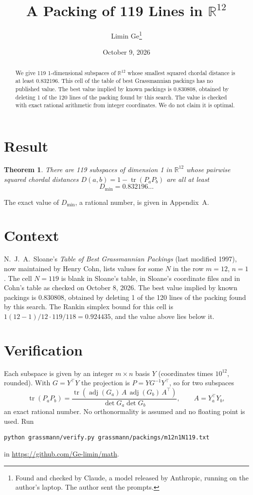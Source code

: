 \documentclass[11pt,a4paper]{article}
\title{A Packing of 119 Lines in $\mathbb{R}^{12}$}
\author{Limin Ge\thanks{Found and checked by Claude, a model released by Anthropic, running on the author's laptop. The author sent the prompts.}}
\date{October 9, 2026}
\newtheorem*{theorem}{Theorem}
\begin{document}
\maketitle
\begin{abstract}
We give 119 1-dimensional subspaces of $\mathbb{R}^{12}$ whose smallest squared chordal distance is at least 0.832196. This cell of the table of best Grassmannian packings has no published value. The best value implied by known packings is 0.830808, obtained by deleting 1 of the 120 lines of the packing found by this search. The value is checked with exact rational arithmetic from integer coordinates. We do not claim it is optimal.
\end{abstract}

\section{Result}
\begin{theorem}
There are 119 subspaces of dimension 1 in $\mathbb{R}^{12}$ whose pairwise squared chordal distances $D(a,b) = 1 - \operatorname{tr}(P_aP_b)$ are all at least
\[ D_{\min} = 0.832196\ldots \]
\end{theorem}
The exact value of $D_{\min}$, a rational number, is given in Appendix~A.


\section{Context}
N.~J.~A.~Sloane's \emph{Table of Best Grassmannian Packings} (last modified 1997), now maintained by Henry Cohn, lists values for some $N$ in the row $m=12$, $n=1$. The cell $N=119$ is blank in Sloane's table, in Sloane's coordinate files and in Cohn's table as checked on October 8, 2026. The best value implied by known packings is 0.830808, obtained by deleting 1 of the 120 lines of the packing found by this search. The Rankin simplex bound for this cell is $1(12-1)/12\cdot 119/118 = 0.924435$, and the value above lies below it.


\section{Verification}
Each subspace is given by an integer $m\times n$ basis $Y$ (coordinates times $10^{12}$, rounded). With $G=Y^\top Y$ the projection is $P=YG^{-1}Y^\top$, so for two subspaces
\[ \operatorname{tr}(P_aP_b)=\frac{\operatorname{tr}(\operatorname{adj}(G_a)\,A\,\operatorname{adj}(G_b)\,A^\top)}{\det G_a\det G_b},\qquad A=Y_a^\top Y_b, \]
an exact rational number. No orthonormality is assumed and no floating point is used. Run
\begin{verbatim}
python grassmann/verify.py grassmann/packings/m12n1N119.txt
\end{verbatim}
in \url{https://github.com/Ge-limin/math}.
\end{document}
